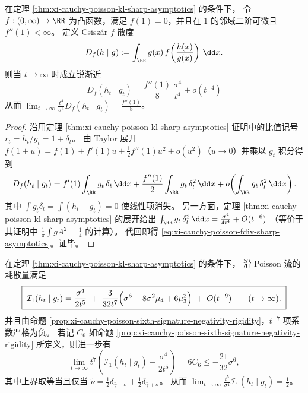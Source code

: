 

\begin{proposition}\label{prop:xi-cauchy-poisson-fdiv-universal-constant}
在定理 \ref{thm:xi-cauchy-poisson-kl-sharp-asymptotics} 的条件下，
令 \(f:(0,\infty)\to\RR\) 为凸函数，满足 \(f(1)=0\)，并且在 \(1\) 的邻域二阶可微且 \(f''(1)<\infty\)。
定义 Csiszár \texorpdfstring{$f$}{f}-散度
\[
D_f(h\mid g):=\int_{\RR} g(x)\,f\!\left(\frac{h(x)}{g(x)}\right)\,\dd x.
\]
则当 \(t\to\infty\) 时成立锐渐近
\begin{equation}\label{eq:xi-cauchy-poisson-fdiv-sharp-asymptotics}
\boxed{\;
D_f(h_t\mid g_t)=\frac{f''(1)}{8}\,\frac{\sigma^4}{t^4}+o(t^{-4})\;}
\end{equation}
从而
\(
\lim_{t\to\infty}\frac{t^4}{\sigma^4}D_f(h_t\mid g_t)=\frac{f''(1)}{8}
\)。
\end{proposition}

\begin{proof}
沿用定理 \ref{thm:xi-cauchy-poisson-kl-sharp-asymptotics} 证明中的比值记号 \(r_t=h_t/g_t=1+\delta_t\)。
由 Taylor 展开 \(f(1+u)=f(1)+f'(1)u+\tfrac12 f''(1)u^2+o(u^2)\)（\(u\to0\)）并乘以 \(g_t\) 积分得到
\[
D_f(h_t\mid g_t)
=f'(1)\int_{\RR} g_t\,\delta_t\,\dd x+\frac{f''(1)}{2}\int_{\RR} g_t\,\delta_t^2\,\dd x+o\!\left(\int_{\RR} g_t\,\delta_t^2\,\dd x\right).
\]
其中 \(\int g_t\delta_t=\int(h_t-g_t)=0\) 使线性项消失。
另一方面，定理 \ref{thm:xi-cauchy-poisson-kl-sharp-asymptotics} 的展开给出
\(
\int_{\RR} g_t\,\delta_t^2\,\dd x=\frac{\sigma^4}{4t^4}+O(t^{-6})
\)
（等价于其证明中 \(\frac{1}{\pi}\int gA^2=\frac14\) 的计算）。
代回即得 \eqref{eq:xi-cauchy-poisson-fdiv-sharp-asymptotics}。证毕。
\end{proof}

\begin{corollary}\label{cor:xi-cauchy-poisson-fisher-sharp-asymptotics}
在定理 \ref{thm:xi-cauchy-poisson-kl-sharp-asymptotics} 的条件下，
沿 Poisson 流的耗散量满足
\begin{equation}\label{eq:xi-cauchy-poisson-fisher-sharp-asymptotics}
\boxed{\;
\mathcal I_1(h_t\mid g_t)=\frac{\sigma^4}{2t^5}
\;+\;\frac{3}{32t^7}\Bigl(\sigma^6-8\sigma^2\mu_4+6\mu_3^2\Bigr)
\;+\;O(t^{-9})\qquad(t\to\infty).\;}
\end{equation}
并且由命题 \ref{prop:xi-cauchy-poisson-sixth-signature-negativity-rigidity}，\(t^{-7}\) 项系数严格为负。
若记 \(C_6\) 如命题 \ref{prop:xi-cauchy-poisson-sixth-signature-negativity-rigidity} 所定义，则进一步有
\[
\lim_{t\to\infty}t^{7}\left(\mathcal I_1(h_t\mid g_t)-\frac{\sigma^4}{2t^5}\right)=6C_6\le -\frac{21}{32}\sigma^6,
\]
其中上界取等当且仅当 \(\tilde\nu=\frac12\delta_{\bar\gamma-\sigma}+\frac12\delta_{\bar\gamma+\sigma}\)。
从而
\(
\lim_{t\to\infty}\frac{t^5}{\sigma^4}\mathcal I_1(h_t\mid g_t)=\frac12
\)。
\end{corollary}

